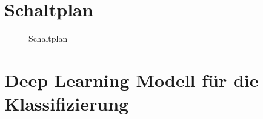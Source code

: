 \chapter{Schaltplan}\label{Anhang_D}
\begin{figure}[H]
    \centering
    \caption{Schaltplan}
\end{figure}

\chapter{Deep Learning Modell für die Klassifizierung}\label{Anhang_E}
